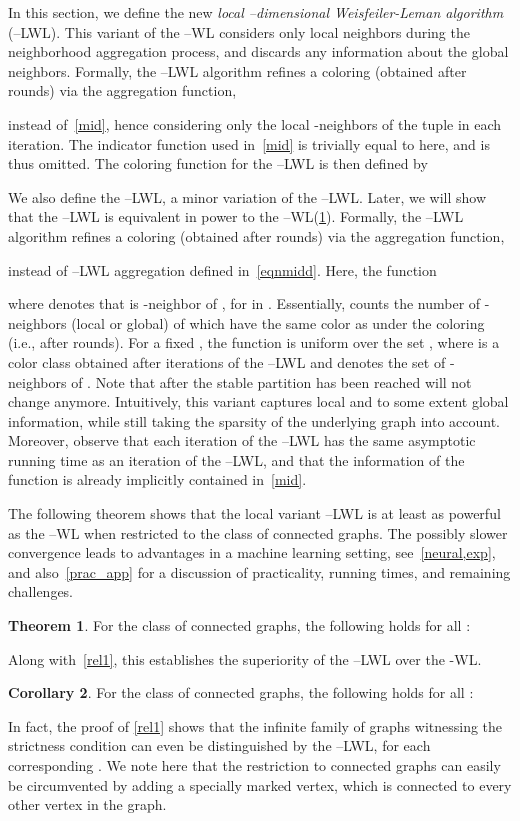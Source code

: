 \documentclass{article}
\theoremstyle{definition}
\newtheorem{theorem}{Theorem}
\newtheorem{corollary}[theorem]{Corollary}
\newcommand{\new}[1]{\emph{#1}}
\newcommand{\kwl}{-\textsf{WL}\xspace}
\newcommand{\deltakwl}{--\textsf{WL}\xspace}
\newcommand{\localkwl}{--\textsf{LWL}\xspace}
\newcommand{\pluskwl}{--\textsf{LWL}\xspace}
\begin{document}
In this section, we define the new \new{local --dimensional Weisfeiler-Leman algorithm} (\localkwl). This variant of the \deltakwl considers only local neighbors during the neighborhood aggregation process, and discards any information about the global neighbors. Formally, the \localkwl algorithm refines a coloring  (obtained after  rounds) via the aggregation function, 
		
instead of~\cref{mid}, hence considering only the local -neighbors of the tuple  in each iteration. The indicator function  used in~\cref{mid} is trivially equal to  here, and is thus omitted. The coloring function for the \localkwl is then defined by
 

We also define the \pluskwl, a minor variation of the \localkwl. Later, we will show that the \pluskwl is equivalent in power to the \deltakwl (\cref{loco}). 
Formally, the \pluskwl algorithm refines a coloring  (obtained after  rounds) via the aggregation function, 

instead of \localkwl aggregation defined in~\cref{eqnmidd}. 
Here, the function

where  denotes that  is -neighbor of , for  in . Essentially,  counts the number of -neighbors (local or global) of  which have the same color as  under the coloring  (i.e., after  rounds). For a fixed ,
the function  is uniform over the set , where  is a color class obtained after  iterations of the \pluskwl and  denotes the set of -neighbors of . 
Note that after the stable partition has been reached  will not change anymore. Intuitively, this variant captures local and to some extent global information, while still taking the sparsity of the underlying graph into account. Moreover, observe that each iteration of the \pluskwl has the same asymptotic running time as an iteration of the \localkwl, and that the information of the  function is already implicitly contained in~\cref{mid}.

The following theorem shows that the local variant \pluskwl is at least as powerful as the \deltakwl when restricted to the class of connected graphs. The possibly slower convergence leads to advantages in a machine learning setting, see~\cref{neural,exp}, and also~\cref{prac_app} for a discussion of practicality, running times, and remaining challenges.
\begin{theorem}\label{loco}
	For the class of connected graphs, the following holds for all :
	
\end{theorem}	
Along with~\cref{rel1}, this establishes the superiority of the \pluskwl over the \kwl. 
\begin{corollary}\label{cloco} For the class of connected graphs, the following holds for all :	
\end{corollary}
In fact, the proof of \cref{rel1} shows that the infinite family of graphs  witnessing the strictness condition can even be distinguished by the \localkwl,
for each corresponding . We note here that the restriction to connected graphs can easily be circumvented by adding a specially marked vertex, which is connected to every other vertex in the graph.
\end{document}
